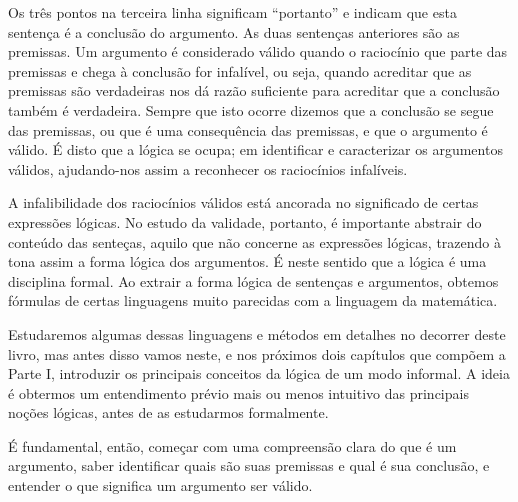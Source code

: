 

\noindent Os três pontos na terceira linha significam ``portanto'' e indicam que esta sentença é a conclusão do argumento. As duas sentenças anteriores são as premissas.
Um argumento é considerado válido quando o raciocínio que parte das premissas e chega à conclusão for infalível, ou seja, quando acreditar que as premissas são verdadeiras nos dá razão suficiente para acreditar que a conclusão também é verdadeira.
Sempre que isto ocorre dizemos que a conclusão se segue das premissas, ou que é uma consequência das premissas, e que o argumento é válido.
É disto que a lógica se ocupa; em identificar e caracterizar os argumentos válidos, ajudando-nos assim a reconhecer os raciocínios infalíveis.

A infalibilidade dos raciocínios válidos está ancorada no significado de certas expressões lógicas.
No estudo da validade, portanto, é importante abstrair do conteúdo das senteças, aquilo que não concerne as expressões lógicas, trazendo à tona assim a forma lógica dos argumentos.
É neste sentido que a lógica é uma disciplina formal.
Ao extrair a forma lógica de sentenças e argumentos, obtemos fórmulas de certas linguagens muito parecidas com a linguagem da matemática.

Estudaremos algumas dessas linguagens e métodos em detalhes no decorrer deste livro, mas antes disso vamos neste, e nos próximos dois capítulos que compõem a Parte I, introduzir os principais conceitos da lógica de um modo informal.
A ideia é obtermos um entendimento prévio mais ou menos intuitivo das principais noções lógicas, antes de as estudarmos formalmente.

É fundamental, então, começar com uma compreensão clara do que é um argumento, saber identificar quais são suas premissas e qual é sua conclusão, e entender o que significa um argumento ser válido.



